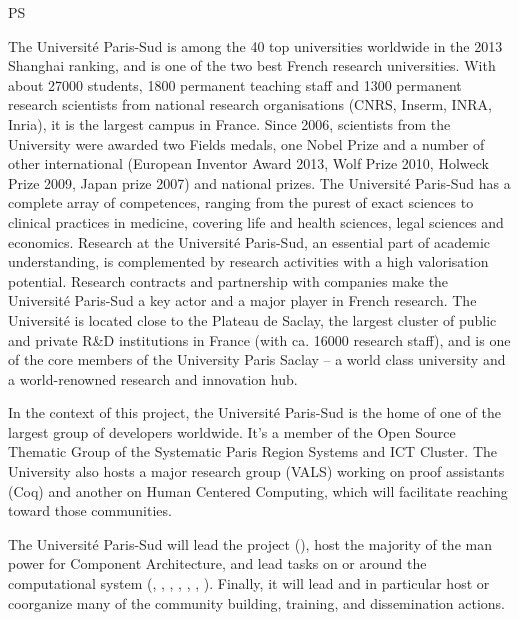 \begin{sitedescription}{PS}

The Université Paris-Sud is among the 40 top universities worldwide in the
2013 Shanghai ranking, and is one of the two best French research
universities. With about 27000 students, 1800 permanent teaching staff
and 1300 permanent research scientists from national research
organisations (CNRS, Inserm, INRA, Inria), it is the largest campus in
France. Since 2006, scientists from the University were awarded two
Fields medals, one Nobel Prize and a number of other international
(European Inventor Award 2013, Wolf Prize 2010, Holweck Prize 2009,
Japan prize 2007) and national prizes.  The Université Paris-Sud has a
complete array of competences, ranging from the purest of exact
sciences to clinical practices in medicine, covering life and health
sciences, legal sciences and economics. Research at the Université
Paris-Sud, an essential part of academic understanding, is
complemented by research activities with a high valorisation
potential. Research contracts and partnership with companies make the
Université Paris-Sud a key actor and a major player in French
research.  The Université is located close to the Plateau de Saclay,
the largest cluster of public and private R\&D institutions in France
(with ca. 16000 research staff), and is one of the core members of the
University Paris Saclay – a world class university and a
world-renowned research and innovation hub.

In the context of this project, the Université Paris-Sud is the
home of one of the largest group of \Sage developers worldwide.
It's a member of the Open Source Thematic Group of the Systematic
Paris Region Systems and ICT Cluster. The University also hosts a
major research group (VALS) working on proof assistants (Coq) and
another on Human Centered Computing, which will facilitate reaching
toward those communities.

The Université Paris-Sud will lead the project (),
host the majority of the man power for 
Component Architecture, and lead tasks on or around the \Sage
computational system (,
,
, ,
, ,
). Finally, it will lead  and in
particular host or coorganize many of the community building,
training, and dissemination actions.


\end{sitedescription}
